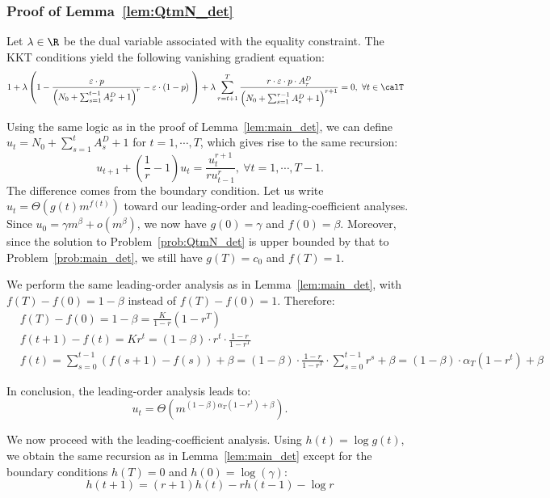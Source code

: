 \documentclass[blindrev]{informs3noheader}
\begin{document}
\subsubsection*{Proof of Lemma~\ref{lem:QtmN_det}}

Let $\lambda\in\R$ be the dual variable associated with the equality constraint. The KKT conditions yield the following vanishing gradient equation:
\begin{align*}
& 1+\lambda\left(1 - \frac{\varepsilon\cdot p}{\left(N_0+ \sum_{s=1}^{t-1} A^{D}_s +1\right)^r} - \varepsilon\cdot(1-p)\ \right)+\lambda\sum_{\tau=t+1}^T\frac{r\cdot\varepsilon \cdot p\cdot A^{D}_\tau}{\left(N_0 +\sum_{s=1}^{\tau-1} A^{D}_s +1\right)^{r+1}}=0,\ \forall t\in\calT
\end{align*}

Using the same logic as in the proof of Lemma~\ref{lem:main_det}, we can define $u_t = N_0 + \sum_{s=1}^t A^{D}_s + 1$ for $t=1,\cdots,T$, which gives rise to the same recursion:
\begin{equation*}
u_{t+1} + \left(\frac{1}{r}-1\right)u_t = \frac{u_t^{r+1}}{ru_{t-1}^r},\ \forall t=1,\cdots,T-1.
\end{equation*}
The difference comes from the boundary condition. 
Let us write $u_t = \Theta(g(t)m^{f(t)})$ toward our leading-order and leading-coefficient analyses. Since $u_0 = \gamma m^\beta + o(m^\beta)$, we now have $g(0)=\gamma$ and $f(0)=\beta$. Moreover, since the solution to Problem~\eqref{prob:QtmN_det} is upper bounded by that to Problem~\eqref{prob:main_det}, we still have $g(T)=c_0$ and $f(T)=1$.

We perform the same leading-order analysis as in Lemma~\ref{lem:main_det}, with $f(T)-f(0)=1-\beta$ instead of $f(T)-f(0)=1$. Therefore:
\begin{align*}
& f(T)-f(0)=1-\beta=\frac{K}{1-r}\left(1-r^T\right)\\
& f(t+1)-f(t)=Kr^t=(1-\beta)\cdot r^{t}\cdot\frac{1-r}{1-r^T}\\
& f(t)=\sum_{s=0}^{t-1}(f(s+1)-f(s))+\beta=(1-\beta)\cdot\frac{1-r}{1-r^T}\cdot\sum_{s=0}^{t-1}r^s+\beta=(1-\beta)\cdot\alpha_T(1-r^t)+\beta
\end{align*}

In conclusion, the leading-order analysis leads to:
$$u_t=\Theta\left(m^{(1-\beta)\alpha_T\left(1-r^t\right) + \beta}\right).$$

We now proceed with the leading-coefficient analysis. Using $h(t)=\log g(t)$, we obtain the same recursion as in Lemma~\ref{lem:main_det} except for the boundary conditions $h(T)=0$ and $h(0)=\log(\gamma)$:
\[h(t+1) = (r+1)h(t)-rh(t-1)-\log r\]
\end{document}
